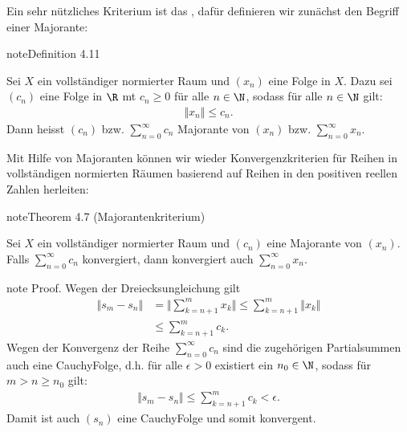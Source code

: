 \documentclass[letterpaper,10pt,english]{jupyterBook}
\begin{document}
Ein sehr nützliches Kriterium ist das , dafür definieren wir zunächst den Begriff einer Majorante:
\label{metrik/reihen:definition-4}
\begin{sphinxadmonition}{note}{Definition 4.11}



Sei \(X\) ein vollständiger normierter Raum und \((x_n)\) eine Folge in \(X\). Dazu sei \((c_n)\) eine Folge in \(\R\) mt \(c_n \geq 0\) für alle \(n \in \N\), sodass für alle \(n \in \N\) gilt:
\begin{equation*}
\begin{split} \Vert x_n \Vert \leq c_n .\end{split}
\end{equation*}
Dann heisst \((c_n)\) bzw. \(\sum_{n=0}^\infty c_n\) Majorante von \((x_n)\) bzw. \(\sum_{n=0}^\infty x_n\).
\end{sphinxadmonition}

Mit Hilfe von Majoranten können wir wieder Konvergenzkriterien für Reihen in vollständigen normierten Räumen basierend auf Reihen in den positiven reellen Zahlen herleiten:
\label{metrik/reihen:theorem-5}
\begin{sphinxadmonition}{note}{Theorem 4.7 (Majorantenkriterium)}



Sei \(X\) ein vollständiger normierter Raum und \((c_n)\) eine Majorante von \((x_n)\). Falls \(\sum_{n=0}^\infty c_n\) konvergiert, dann konvergiert auch \(\sum_{n=0}^\infty x_n\).
\end{sphinxadmonition}

\begin{sphinxadmonition}{note}
Proof.  Wegen der Dreiecksungleichung gilt
\begin{align*}
\Vert s_m - s_n \Vert &= \Vert \sum_{k=n+1}^m x_k \Vert  \leq \sum_{k=n+1}^m  \Vert x_k \Vert \\
&\leq \sum_{k=n+1}^m c_k.\end{align*}
Wegen der Konvergenz der Reihe \(\sum_{n=0}^\infty c_n\) sind die zugehörigen Partialsummen auch eine Cauchy\sphinxhyphen{}Folge, d.h. für alle \(\epsilon > 0\) existiert ein \(n_0 \in \N\), sodass für \(m > n \geq n_0\) gilt:
\begin{equation*}
\begin{split} \Vert s_m - s_n \Vert \leq \sum_{k=n+1}^m c_k < \epsilon.\end{split}
\end{equation*}
Damit ist auch \((s_n)\) eine Cauchy\sphinxhyphen{}Folge und somit konvergent.
\end{sphinxadmonition}
\end{document}
